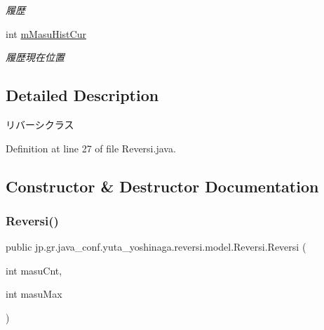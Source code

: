 \begin{DoxyCompactItemize}
\begin{DoxyCompactList}\small\item\em 履歴 \end{DoxyCompactList}\item 
\mbox{\label{classjp_1_1gr_1_1java__conf_1_1yuta__yoshinaga_1_1reversi_1_1model_1_1_reversi_aaedf62ec913875540109bfbe01bb1969}} 
int \hyperlink{classjp_1_1gr_1_1java__conf_1_1yuta__yoshinaga_1_1reversi_1_1model_1_1_reversi_aaedf62ec913875540109bfbe01bb1969}{m\+Masu\+Hist\+Cur}
\begin{DoxyCompactList}\small\item\em 履歴現在位置 \end{DoxyCompactList}\end{DoxyCompactItemize}


\subsection{Detailed Description}
リバーシクラス 

Definition at line 27 of file Reversi.\+java.



\subsection{Constructor \& Destructor Documentation}
\mbox{\label{classjp_1_1gr_1_1java__conf_1_1yuta__yoshinaga_1_1reversi_1_1model_1_1_reversi_a22abbc9c1a2016388dafb08dc9a7b820}} 
\subsubsection{\texorpdfstring{Reversi()}{Reversi()}\hspace{0.1cm}{\footnotesize\ttfamily [1/2]}}
{\footnotesize\ttfamily public jp.\+gr.\+java\+\_\+conf.\+yuta\+\_\+yoshinaga.\+reversi.\+model.\+Reversi.\+Reversi (\begin{DoxyParamCaption}\item[{int}]{masu\+Cnt,  }\item[{int}]{masu\+Max }\end{DoxyParamCaption})}



